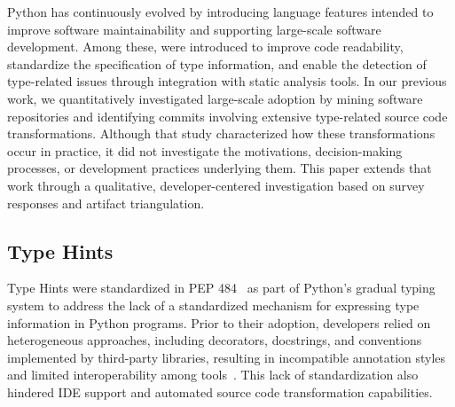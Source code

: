 
Python has continuously evolved by introducing language features intended to improve software maintainability and supporting large-scale software development. Among these, \ths were introduced to improve code readability, standardize the specification of type information, and enable the detection of type-related issues through integration with static analysis tools. In our previous work, we quantitatively investigated large-scale \ths adoption by mining software repositories and identifying commits involving extensive type-related source code transformations. Although that study characterized how these transformations occur in practice, it did not investigate the motivations, decision-making processes, or development practices underlying them. This paper extends that work through a qualitative, developer-centered investigation based on survey responses and artifact triangulation.

\subsection{Type Hints}\label{subsec:ths}

Type Hints were standardized in PEP 484~\cite{pep484} as part of Python's gradual typing system to address the lack of a standardized mechanism for expressing type information in Python programs. Prior to their adoption, developers relied on heterogeneous approaches, including decorators, docstrings, and conventions implemented by third-party libraries, resulting in incompatible annotation styles and limited interoperability among tools~\cite{pep3107}. This lack of standardization also hindered IDE support and automated source code transformation capabilities.

